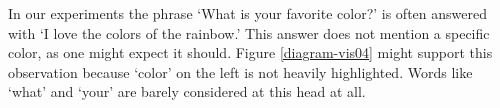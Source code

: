In our experiments the phrase `What is your favorite color?' is often answered with `I love the colors of the rainbow.' This answer does not mention a specific color, as one might expect it should. Figure \ref{diagram-vis04} might support this observation because `color' on the left is not heavily highlighted. Words like `what' and `your' are barely considered at this head at all. 

